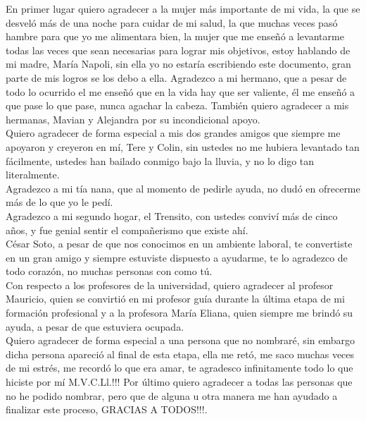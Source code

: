 En primer lugar quiero agradecer a la mujer más importante de mi  vida,  la que se desveló más de una noche  para cuidar de mi salud, la que muchas veces pasó hambre para que yo me alimentara bien, la mujer que me enseñó a levantarme todas las veces que sean necesarias para lograr mis objetivos, estoy hablando de mi madre, María Napoli, sin ella yo no  estaría escribiendo este documento, gran parte de mis logros se los debo a ella. Agradezco a mi hermano,  que a pesar de todo lo ocurrido el me enseñó que en la vida hay que ser valiente, él me enseñó a que pase lo que pase, nunca agachar la cabeza. También quiero agradecer a mis hermanas, Mavian y Alejandra por su incondicional apoyo.
\\

Quiero agradecer de forma especial a mis dos grandes amigos que siempre me apoyaron y creyeron en mí, Tere y Colin, sin ustedes  no me hubiera levantado tan fácilmente, ustedes han  bailado conmigo bajo la lluvia, y no lo digo tan literalmente.\\

Agradezco a mi tía nana, que al momento de pedirle ayuda, no dudó en ofrecerme más de lo que yo le pedí.\\
Agradezco a mi segundo hogar, el Trensito,  con ustedes conviví más de cinco años, y fue genial sentir el compañerismo que existe ahí.
\\

César Soto, a pesar de que nos conocimos en un ambiente laboral, te convertiste en un gran amigo y siempre estuviste dispuesto a ayudarme, te lo agradezco de todo corazón, no muchas personas con como tú.\\


Con respecto a los profesores de la universidad, quiero agradecer al profesor Mauricio, quien se convirtió en mi profesor guía durante la última etapa de mi formación profesional y a la profesora María Eliana, quien siempre me brindó su ayuda, a pesar de que estuviera ocupada.\\

Quiero agradecer de forma especial a una persona que no nombraré, sin embargo dicha persona apareció al final de esta etapa, ella me retó, me saco muchas veces de mi estrés, me recordó lo que era amar, te agradesco infinitamente todo lo que hiciste por mí M.V.C.Ll.!!! 
Por último quiero agradecer a todas las personas que no he podido nombrar, pero que de alguna u otra  manera me han ayudado  a finalizar este proceso, GRACIAS A TODOS!!!.


 
 
 
 
 